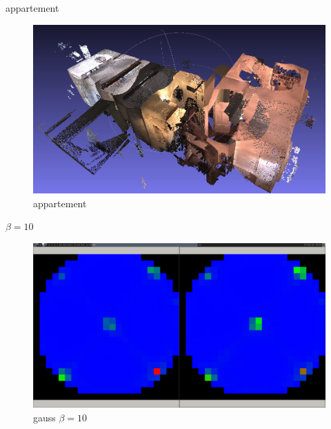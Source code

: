 \documentclass[11pt]{beamer}
\begin{document}
\begin{frame}{appartement}
\begin{figure}[hbtp]
\centering
\includegraphics[width=\textwidth]{2014-02-28-101630_1015x585_scrot.png}
\caption{appartement}
\end{figure}
\end{frame}

\begin{frame}{$\beta=10$}
\begin{figure}[hbtp]
\centering
\includegraphics[width=\textwidth]{2014-02-28-085518_1600x900_scrot.png}
\caption{gauss $\beta=10$}
\end{figure}
\end{frame}
\end{document}
